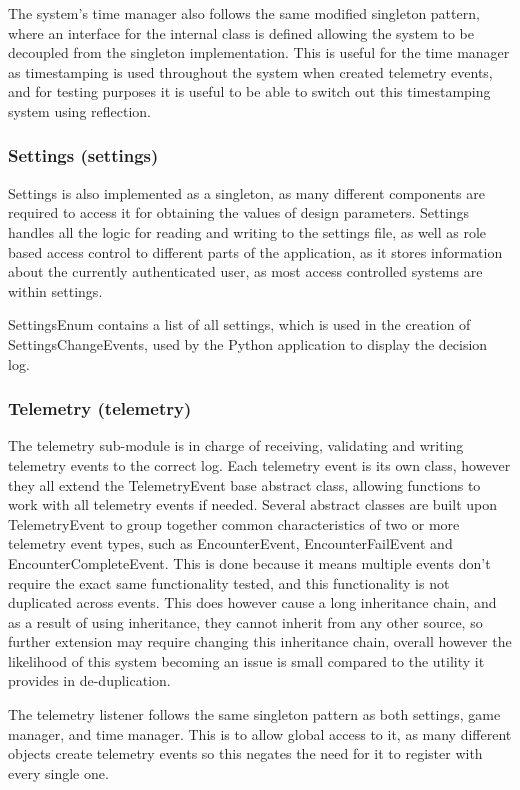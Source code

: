The system's time manager also follows the same modified singleton pattern, where an interface for the internal class is defined allowing the system to be decoupled from the singleton implementation. This is useful for the time manager as timestamping is used throughout the system when created telemetry events, and for testing purposes it is useful to be able to switch out this timestamping system using reflection.

\subsubsection{Settings (settings)}
Settings is also implemented as a singleton, as many different components are required to access it for obtaining the values of design parameters. Settings handles all the logic for reading and writing to the settings file, as well as role based access control to different parts of the application, as it stores information about the currently authenticated user, as most access controlled systems are within settings.

SettingsEnum contains a list of all settings, which is used in the creation of SettingsChangeEvents, used by the Python application to display the decision log.

\subsubsection{Telemetry (telemetry)}
The telemetry sub-module is in charge of receiving, validating and writing telemetry events to the correct log. Each telemetry event is its own class, however they all extend the TelemetryEvent base abstract class, allowing functions to work with all telemetry events if needed. Several abstract classes are built upon TelemetryEvent to group together common characteristics of two or more telemetry event types, such as EncounterEvent, EncounterFailEvent and EncounterCompleteEvent. This is done because it means multiple events don't require the exact same functionality tested, and this functionality is not duplicated across events. This does however cause a long inheritance chain, and as a result of using inheritance, they cannot inherit from any other source, so further extension may require changing this inheritance chain, overall however the likelihood of this system becoming an issue is small compared to the utility it provides in de-duplication.

The telemetry listener follows the same singleton pattern as both settings, game manager, and time manager. This is to allow global access to it, as many different objects create telemetry events so this negates the need for it to register with every single one.

